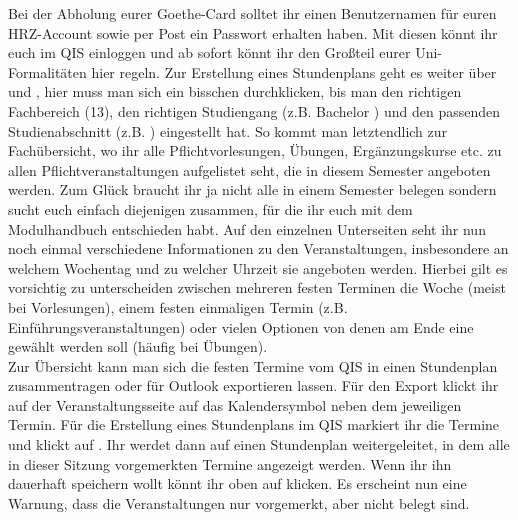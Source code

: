 Bei der Abholung eurer Goethe-Card solltet ihr einen Benutzernamen für euren HRZ-Account sowie per Post ein Passwort erhalten haben. Mit diesen könnt ihr euch im QIS einloggen und ab sofort könnt ihr den Großteil eurer Uni-Formalitäten hier regeln. Zur Erstellung eines Stundenplans geht es weiter über  und , hier muss man sich ein bisschen durchklicken, bis man den richtigen Fachbereich (13), den richtigen Studiengang (z.B. Bachelor ) und den passenden Studienabschnitt (z.B. ) eingestellt hat. So kommt man letztendlich zur Fachübersicht, wo ihr alle Pflichtvorlesungen, Übungen, Ergänzungskurse etc. zu allen Pflichtveranstaltungen aufgelistet seht, die in diesem Semester angeboten werden. Zum Glück braucht ihr ja nicht alle in einem Semester belegen sondern sucht euch einfach diejenigen zusammen, für die ihr euch mit dem Modulhandbuch entschieden habt. Auf den einzelnen Unterseiten seht ihr nun noch einmal verschiedene Informationen zu den Veranstaltungen, insbesondere an welchem Wochentag und zu welcher Uhrzeit sie angeboten werden. Hierbei gilt es vorsichtig zu unterscheiden zwischen mehreren festen Terminen die Woche (meist bei Vorlesungen), einem festen einmaligen Termin (z.B. Einführungsveranstaltungen) oder vielen Optionen von denen am Ende eine gewählt werden soll (häufig bei Übungen). \\
Zur Übersicht kann man sich die festen Termine vom QIS in einen Stundenplan zusammentragen oder für Outlook exportieren lassen. Für den Export klickt ihr auf der Veranstaltungsseite auf das Kalendersymbol neben dem jeweiligen Termin. Für die Erstellung eines Stundenplans im QIS markiert ihr die Termine und klickt auf . Ihr werdet dann auf einen Stundenplan weitergeleitet, in dem alle in dieser Sitzung vorgemerkten Termine angezeigt werden. Wenn ihr ihn dauerhaft speichern wollt könnt ihr oben auf  klicken. Es erscheint nun eine Warnung, dass die Veranstaltungen nur vorgemerkt, aber nicht belegt sind.
%
%
